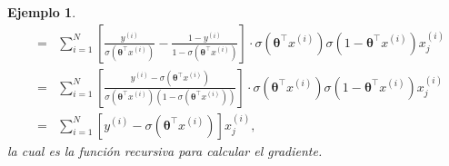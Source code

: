 \documentclass[12pt]{article}
\newtheorem{Ejem}{Ejemplo}%
\begin{document}
\begin{Ejem}
\begin{eqnarray*}
&=& \sum_{i=1}^{N} \left[ \frac{y^{(i)}}{\sigma(\boldsymbol{\theta}^{\top} x^{(i)})} 
- \frac{1 - y^{(i)}}{1 - \sigma(\boldsymbol{\theta}^{\top} x^{(i)})} \right]
\cdot  \sigma(\boldsymbol{\theta}^{\top} x^{(i)})\sigma(1-\boldsymbol{\theta}^{\top} x^{(i)})x_{j}^{(i)}\\
&=& \sum_{i=1}^{N} \left[ \frac{y^{(i)}- \sigma(\boldsymbol{\theta}^{\top}x^{(i)})}
{\sigma(\boldsymbol{\theta}^{\top} x^{(i)})(1 - \sigma(\boldsymbol{\theta}^{\top} x^{(i)}))} \right]
\cdot  \sigma(\boldsymbol{\theta}^{\top} x^{(i)})\sigma(1-\boldsymbol{\theta}^{\top} x^{(i)})x_{j}^{(i)}\\
&=&\sum_{i=1}^{N}\left[y^{(i)}-\sigma(\boldsymbol{\theta}^{\top} x^{(i)})\right]x_{j}^{(i)}, 
\end{eqnarray*}
la cual es la funci\'on recursiva para calcular el gradiente.
\end{Ejem}
\end{document}
